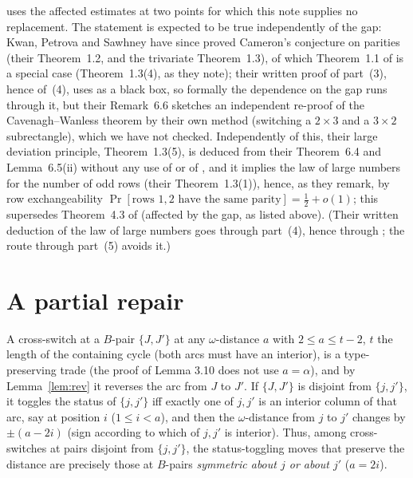 \documentclass[11pt]{article}
\theoremstyle{remark}
\begin{document}
\cite{CW16} uses the affected estimates at two points for which this
note supplies no replacement.  The statement is expected
to be true independently of the gap: Kwan, Petrova and Sawhney
\cite{KPS25} have since proved Cameron's conjecture on parities (their
Theorem~1.2, and the trivariate Theorem~1.3), of which Theorem~1.1 of
\cite{CW16} is a special case (Theorem~1.3(4), as they note); their
written proof of part~(3), hence of~(4), uses \cite{CW16} as a black
box, so formally the dependence on the gap runs through it, but
their Remark~6.6 sketches an independent re-proof of the
Cavenagh--Wanless theorem by their own method (switching a $2\times3$
and a $3\times2$ subrectangle), which we have not checked.  Independently
of this, their large deviation principle, Theorem~1.3(5), is deduced
from their Theorem~6.4 and Lemma~6.5(ii) without any use of \cite{CW16}
or of \cite{CGW08}, and it implies the law of large numbers for the
number of odd rows (their Theorem~1.3(1)), hence, as they remark, by row
exchangeability
$\Pr[\text{rows }1,2\text{ have the same parity}]=\tfrac12+o(1)$; this
supersedes Theorem~4.3 of \cite{CGW08} (affected by the gap, as listed
above).  (Their written deduction of the law of large numbers goes
through part~(4), hence through \cite{CW16}; the route through
part~(5) avoids it.)

\section{A partial repair}

A cross-switch at a $B$-pair $\{J,J'\}$ at any $\omega$-distance $a$
with $2\le a\le t-2$, $t$ the length of the containing cycle (both
arcs must have an interior), is a type-preserving trade (the proof of
Lemma 3.10 does not use $a=\alpha$), and by Lemma~\ref{lem:rev} it reverses the arc from
$J$ to $J'$.  If $\{J,J'\}$ is disjoint from $\{j,j'\}$, it toggles the
status of $\{j,j'\}$ iff exactly one of $j,j'$ is an interior column of
that arc, say at position $i$ ($1\le i<a$), and then the
$\omega$-distance from $j$ to $j'$ changes by $\pm(a-2i)$ (sign
according to which of $j,j'$ is interior).  Thus, among cross-switches
at pairs disjoint from $\{j,j'\}$, the status-toggling moves that
preserve the distance are precisely those at $B$-pairs
\emph{symmetric about $j$ or about $j'$} ($a=2i$).
\end{document}
